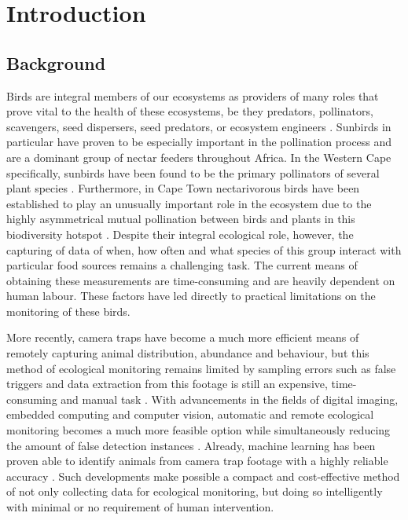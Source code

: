 
\glsresetall %
\chapter[Introduction]{Introduction}\label{ch:Introduction}

\section{Background}

Birds are integral members of our ecosystems as providers of many roles that prove vital to the health of these ecosystems, be they predators, pollinators, scavengers, seed dispersers, seed predators, or ecosystem engineers \cite{Whelan2008}. Sunbirds in particular have proven to be especially important in the pollination process and are a dominant group of nectar feeders throughout Africa. In the Western Cape specifically, sunbirds have been found to be the primary pollinators of several plant species \cite{deWaal2012}. Furthermore, in Cape Town nectarivorous birds have been established to play an unusually important role in the ecosystem due to the highly asymmetrical mutual pollination between birds and plants in this biodiversity hotspot \cite{Coetzee2018}. Despite their integral ecological role, however, the capturing of data of when, how often and what species of this group interact with particular food sources remains a challenging task. The current means of obtaining these measurements are time-consuming and are heavily dependent on human labour. These factors have led directly to practical limitations on the monitoring of these birds.
\par\vspace{6pt}
More recently, camera traps have become a much more efficient means of remotely capturing animal distribution, abundance and behaviour, but this method of ecological monitoring remains limited by sampling errors such as false triggers and data extraction from this footage is still an expensive, time-consuming and manual task \cite{Burton2015, Norouzzadeh2018}. With advancements in the fields of digital imaging, embedded computing and computer vision, automatic and remote ecological monitoring becomes a much more feasible option while simultaneously reducing the amount of false detection instances \cite{Christin2019}. Already, machine learning has been proven able to identify animals from camera trap footage with a highly reliable accuracy \cite{Norouzzadeh2018}. Such developments make possible a compact and cost-effective method of not only collecting data for ecological monitoring, but doing so intelligently with minimal or no requirement of human intervention.
